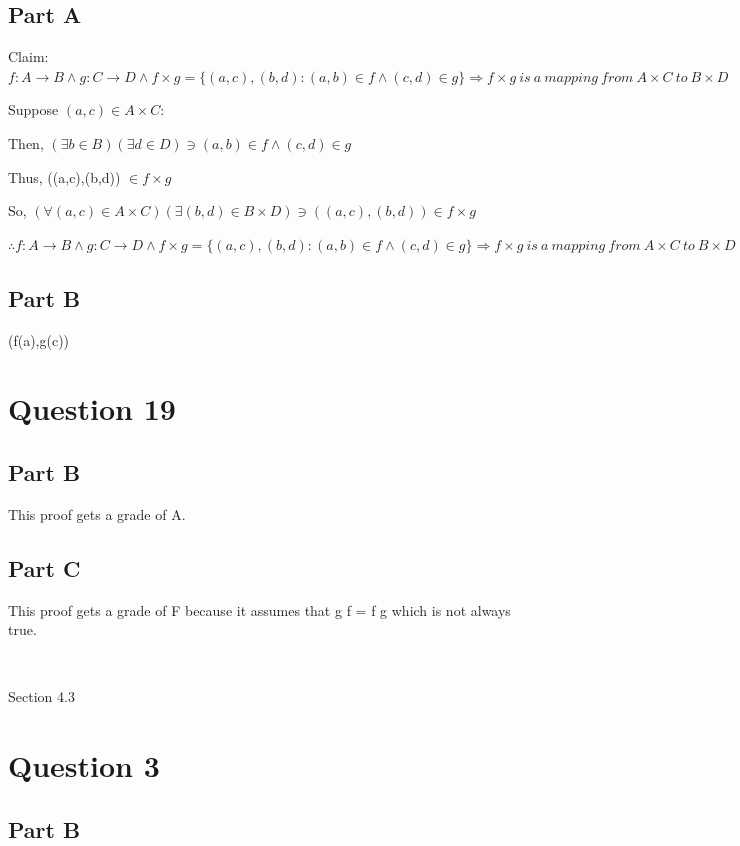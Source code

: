 \documentclass{article}
\begin{document}
\subsection*{Part A}
Claim: $f: A \rightarrow B \wedge g: C \rightarrow D \wedge f \times g = \{(a,c),(b,d): (a,b) \in f \wedge (c,d) \in g \} \Rightarrow f \times g \ is \ a \ mapping \ from \ A \times C \ to \ B \times D$

Suppose $(a,c) \in A \times C$:

Then, $(\exists b \in B)(\exists d \in D) \ni (a,b) \in f \wedge (c,d) \in g$

Thus, ((a,c),(b,d)) $\in f \times g$

So, $(\forall(a,c) \in A \times C)(\exists(b,d)\in B \times D) \ni  ((a,c),(b,d)) \in f \times g$

$\therefore f: A \rightarrow B \wedge g: C \rightarrow D \wedge f \times g = \{(a,c),(b,d): (a,b) \in f \wedge (c,d) \in g \} \Rightarrow f \times g \ is \ a \ mapping \ from \ A \times C \ to \ B \times D$

\subsection*{Part B}

(f(a),g(c))

\section*{Question 19}


\subsection*{Part B}

This proof gets a grade of A.

\subsection*{Part C}

This proof gets a grade of F because it assumes that g \textopenbullet f = f \textopenbullet g which is not always true.

\

{\huge{Section 4.3}}
\section*{Question 3}
\subsection*{Part B}
\end{document}

